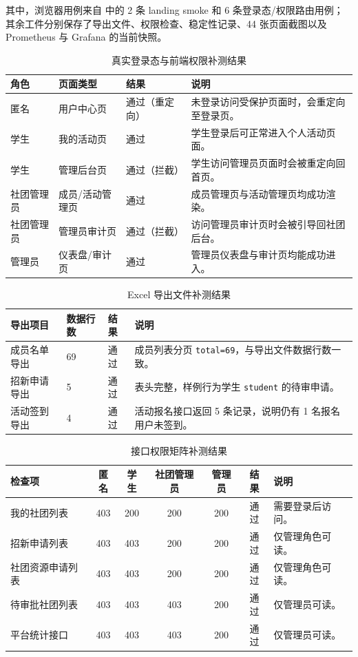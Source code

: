 其中，浏览器用例来自  中的 2 条 landing smoke 和 6 条登录态/权限路由用例；其余工件分别保存了导出文件、权限检查、稳定性记录、44 张页面截图以及 Prometheus 与 Grafana 的当前快照。

\begin{table}[H]
\centering
\footnotesize
\caption{真实登录态与前端权限补测结果}
\label{tab:browser-smoke-live}
\begin{tabular}{p{1.6cm}p{3.2cm}p{1.9cm}p{5.3cm}}
\toprule
角色 & 页面类型 & 结果 & 说明 \\
\midrule
匿名 & 用户中心页 & 通过（重定向） & 未登录访问受保护页面时，会重定向至登录页。 \\
学生 & 我的活动页 & 通过 & 学生登录后可正常进入个人活动页面。 \\
学生 & 管理后台页 & 通过（拦截） & 学生访问管理员页面时会被重定向回首页。 \\
社团管理员 & 成员/活动管理页 & 通过 & 成员管理页与活动管理页均成功渲染。 \\
社团管理员 & 管理员审计页 & 通过（拦截） & 访问管理员审计页时会被引导回社团后台。 \\
管理员 & 仪表盘/审计页 & 通过 & 管理员仪表盘与审计页均能成功进入。 \\
\bottomrule
\end{tabular}
\end{table}

\begin{table}[H]
\centering
\small
\caption{Excel 导出文件补测结果}
\label{tab:export-check-live}
\begin{tabular}{p{4.2cm}p{1.5cm}p{1.6cm}p{5.3cm}}
\toprule
导出项目 & 数据行数 & 结果 & 说明 \\
\midrule
成员名单导出 & 69 & 通过 & 成员列表分页 \texttt{total=69}，与导出文件数据行数一致。 \\
招新申请导出 & 5 & 通过 & 表头完整，样例行为学生 \texttt{student} 的待审申请。 \\
活动签到导出 & 4 & 通过 & 活动报名接口返回 5 条记录，说明仍有 1 名报名用户未签到。 \\
\bottomrule
\end{tabular}
\end{table}

\begin{table}[H]
\centering
\footnotesize
\caption{接口权限矩阵补测结果}
\label{tab:permission-matrix-live}
\begin{tabular}{p{4.7cm}cccccp{4.5cm}}
\toprule
检查项 & 匿名 & 学生 & 社团管理员 & 管理员 & 结果 & 说明 \\
\midrule
我的社团列表 & 403 & 200 & 200 & 200 & 通过 & 需要登录后访问。 \\
招新申请列表 & 403 & 403 & 200 & 200 & 通过 & 仅管理角色可读。 \\
社团资源申请列表 & 403 & 403 & 200 & 200 & 通过 & 仅管理角色可读。 \\
待审批社团列表 & 403 & 403 & 403 & 200 & 通过 & 仅管理员可读。 \\
平台统计接口 & 403 & 403 & 403 & 200 & 通过 & 仅管理员可读。 \\
\bottomrule
\end{tabular}
\end{table}

